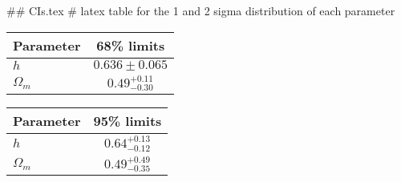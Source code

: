 ## CIs.tex
# latex table for the 1 and 2 sigma distribution of each parameter

\begin{tabular} { l  c}
 Parameter &  68\% limits\\
\hline
{\boldmath$h              $} & $0.636\pm 0.065            $\\
{\boldmath$\Omega_m       $} & $0.49^{+0.11}_{-0.30}      $\\
\hline
\end{tabular}

\begin{tabular} { l  c}
 Parameter &  95\% limits\\
\hline
{\boldmath$h              $} & $0.64^{+0.13}_{-0.12}      $\\
{\boldmath$\Omega_m       $} & $0.49^{+0.49}_{-0.35}      $\\
\hline
\end{tabular}
